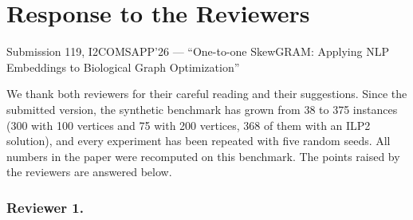 \section*{Response to the Reviewers}
\noindent Submission 119, I2COMSAPP'26 --- ``One-to-one SkewGRAM: Applying NLP Embeddings to Biological Graph Optimization''
\medskip

We thank both reviewers for their careful reading and their suggestions. Since the submitted version, the synthetic benchmark has grown from 38 to 375 instances (300 with 100 vertices and 75 with 200 vertices, 368 of them with an ILP2 solution), and every experiment has been repeated with five random seeds. All numbers in the paper were recomputed on this benchmark. The points raised by the reviewers are answered below.

\subsubsection{Reviewer 1.}

